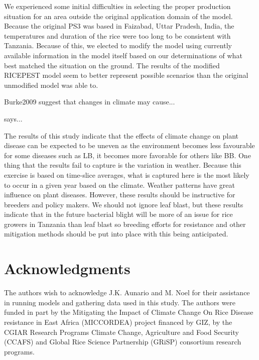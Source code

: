 \documentclass[preprint,12pt]{elsarticle}
\begin{document}
We experienced some initial difficulties in selecting the proper production situation for an area outside the original application domain of the model. Because the original PS3 was based in Faizabad, Uttar Pradesh, India, the temperatures and duration of the rice were too long to be consistent with Tanzania. Because of this, we elected to modify the model using currently available information in the model itself based on our determinations of what best matched the situation on the ground. The results of the modified RICEPEST model seem to better represent possible scenarios than the original unmodified model was able to.

{Burke2009} suggest that changes in climate may cause...

\citet{Thornton2009} says...

The results of this study indicate that the effects of climate change on plant disease can be expected to be uneven as the environment becomes less favourable for some diseases such as LB, it becomes more favorable for others like BB. One thing that the results fail to capture is the variation in weather. Because this exercise is based on time-slice averages, what is captured here is the most likely to occur in a given year based on the climate. Weather patterns have great influence on plant diseases. However, these results should be instructive for breeders and policy makers. We should not ignore leaf blast, but these results indicate that in the future bacterial blight will be more of an issue for rice growers in Tanzania than leaf blast so breeding efforts for resistance and other mitigation methods should be put into place with this being anticipated.

\section{Acknowledgments}
The authors wish to acknowledge J.K. Aunario and M. Noel for their assistance in running models and gathering data used in this study. The authors were funded in part by the Mitigating the Impact of Climate Change On Rice Disease resistance in East Africa (MICCORDEA) project financed by GIZ, by the CGIAR Research Programs Climate Change, Agriculture and Food Security (CCAFS) and Global Rice Science Partnership (GRiSP) consortium research programs.

\end{document}
